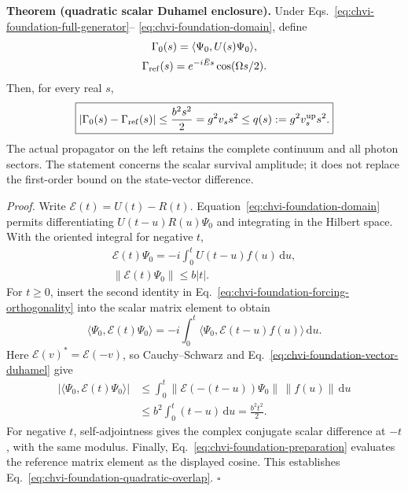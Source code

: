 \noindent\textbf{Theorem (quadratic scalar Duhamel enclosure).}
Under Eqs.~\eqref{eq:chvi-foundation-full-generator}--
\eqref{eq:chvi-foundation-domain}, define
\begin{equation}
\begin{gathered}
\Gamma_0(s)=\langle\Psi_0,U(s)\Psi_0\rangle,
 \\
 \Gamma_{\rm ref}(s)=e^{-i\bar Es}\cos(\Omega s/2).
\end{gathered}
\end{equation}
Then, for every real $s$,
\begin{equation}
 \boxed{\begin{gathered}
 |\Gamma_0(s)-\Gamma_{\rm ref}(s)|
 \leq\frac{b^2s^2}{2}
 =g^2v_s s^2
 \leq q(s):=g^2v_s^{\rm up}s^2.
 \end{gathered}}
\label{eq:chvi-foundation-quadratic-overlap}
\end{equation}
The actual propagator on the left retains the complete continuum and all
photon sectors. The statement concerns the scalar survival amplitude;
it does not replace the first-order bound on the state-vector difference.

\noindent\emph{Proof.}
Write $\mathcal E(t)=U(t)-R(t)$. Equation~\eqref{eq:chvi-foundation-domain}
permits differentiating $U(t-u)R(u)\Psi_0$ and integrating in the Hilbert
space. With the oriented integral for negative $t$,
\begin{equation}
\begin{gathered}
\mathcal E(t)\Psi_0
   =-i\int_0^t U(t-u)f(u)\,\mathrm du,
 \\
 \|\mathcal E(t)\Psi_0\|\leq b|t|.
\end{gathered}
\label{eq:chvi-foundation-vector-duhamel}
\end{equation}
For $t\geq0$, insert the second identity in
Eq.~\eqref{eq:chvi-foundation-forcing-orthogonality} into the scalar
matrix element to obtain
\begin{equation}
 \langle\Psi_0,\mathcal E(t)\Psi_0\rangle
 =-i\int_0^t
       \langle\Psi_0,\mathcal E(t-u)f(u)\rangle\,\mathrm du.
\end{equation}
Here $\mathcal E(v)^*=\mathcal E(-v)$, so
Cauchy--Schwarz and Eq.~\eqref{eq:chvi-foundation-vector-duhamel} give
\begin{equation}
\begin{split}
 |\langle\Psi_0,\mathcal E(t)\Psi_0\rangle|
 &\leq\int_0^t
       \|\mathcal E(-(t-u))\Psi_0\|\,\|f(u)\|\,\mathrm du\\
 &\leq b^2\int_0^t(t-u)\,\mathrm du
 =\frac{b^2t^2}{2}.
\end{split}
\end{equation}
For negative $t$, self-adjointness gives the complex conjugate scalar
difference at $-t$, with the same modulus. Finally,
Eq.~\eqref{eq:chvi-foundation-preparation} evaluates the reference matrix
element as the displayed cosine. This establishes
Eq.~\eqref{eq:chvi-foundation-quadratic-overlap}. $\square$

